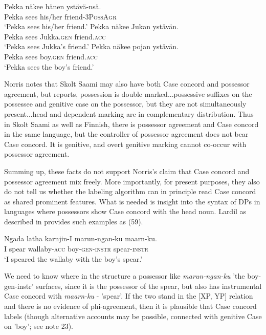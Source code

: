 \documentclass[output=paper
,modfonts
,nonflat]{langsci/langscibook}
\begin{document}
\begin{exe}
	\ex \xlist
	\ex
	\gll Pekka n\"{a}kee  hänen     yst\"{a}v\"{a}-ns\"{a}.\\
	Pekka sees    his/her   friend-3P\textsc{oss}A\textsc{gr}\\
	\glt `Pekka sees his/her friend.'
	\ex
	\gll Pekka n\"{a}kee   Jukan        yst\"{a}v\"{a}n.\\
	 Pekka sees       Jukka.\textsc{gen}   friend.\textsc{acc}\\
	\glt `Pekka sees Jukka's friend.'
	\ex
	\gll Pekka n\"{a}kee   pojan       yst\"{a}v\"{a}n.\\
	Pekka sees     boy.\textsc{gen}     friend.\textsc{acc}\\
	\glt `Pekka sees the boy's friend.'
	\endxlist
\end{exe}
Norris notes that Skolt Saami may also have both Case concord and possessor agreement, but \citet{Miestamo2011} reports, {\textquotedbl}possession is double marked...possessive suffixes on the possessee and genitive case on the possessor, but they are not simultaneously present...head and dependent marking are in complementary distribution.{\textquotedbl} Thus in Skolt Saami as well as Finnish, there is possessor agreement and Case concord in the same language, but the controller of possessor agreement does not bear Case concord. It is genitive, and overt genitive marking cannot co-occur with possessor agreement. 

Summing up, these facts do not support Norris’s claim that Case concord and possessor agreement mix freely. More importantly, for present purposes, they also do not tell us whether the labeling algorithm can in principle {\textquotedbl}read{\textquotedbl} Case concord as shared prominent features. What is needed is insight into the syntax of DPs in languages where possessors show Case concord with the head noun. Lardil as described in \citet{Richards2007} provides such examples as (59).

\begin{exe}
\ex
\gll Ngada latha   karnjin-I       marun-ngan-ku   maarn-ku.\\
I    spear  wallaby-\textsc{acc} boy-\textsc{gen-instr}    spear-\textsc{instr}\\
\glt `I speared the wallaby with the boy's spear.'
\end{exe}
We need to know where in the structure a possessor like \textit{marun-ngan-ku} 'the boy-gen-instr' surfaces, since it is the possessor of the spear, but also has instrumental Case concord with \textit{maarn-ku} - 'spear'. If the two stand in the [XP, YP] relation and there is no evidence of phi-agreement, then it is plausible that Case concord labels (though alternative accounts may be possible, connected with genitive Case on 'boy'; see note 23).
\end{document}
